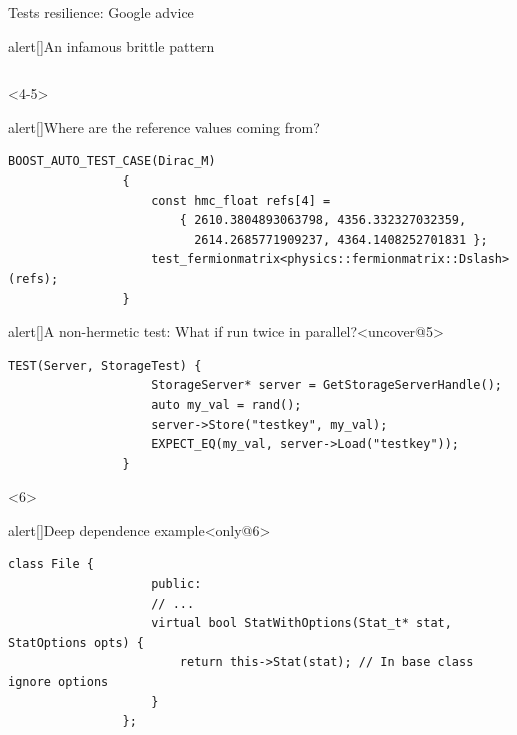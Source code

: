 \begin{frame}[fragile]{Tests resilience: Google advice}
\begin{onlyenv}
\begin{varblock}{alert}[\textwidth]{An infamous brittle pattern}
\begin{lstlisting}[style=MyCpp]
            \end{lstlisting}
        \end{varblock}
    \end{onlyenv}
    \begin{onlyenv}<4-5>
        \begin{varblock}{alert}[\textwidth]{Where are the reference values coming from?}
            \begin{lstlisting}[style=MyCpp]
                BOOST_AUTO_TEST_CASE(Dirac_M)
                {
                    const hmc_float refs[4] =
                        { 2610.3804893063798, 4356.332327032359,
                          2614.2685771909237, 4364.1408252701831 };
                    test_fermionmatrix<physics::fermionmatrix::Dslash>(refs);
                }
            \end{lstlisting}
        \end{varblock}
        \begin{varblock}{alert}[\textwidth]{A non-hermetic test: What if run twice in parallel?}<uncover@5>
            \begin{lstlisting}[style=MyCpp]
                TEST(Server, StorageTest) {
                    StorageServer* server = GetStorageServerHandle();
                    auto my_val = rand();
                    server->Store("testkey", my_val);
                    EXPECT_EQ(my_val, server->Load("testkey"));
                }
            \end{lstlisting}
        \end{varblock}
    \end{onlyenv}
    \begin{onlyenv}<6>
        \vspace{-3mm}
        \begin{varblock}{alert}[\textwidth]{Deep dependence example}<only@6>
            \begin{lstlisting}[style=MyCpp]
                class File {
                    public:
                    // ...
                    virtual bool StatWithOptions(Stat_t* stat, StatOptions opts) {
                        return this->Stat(stat); // In base class ignore options
                    }
                };

\end{lstlisting}
\end{varblock}
\end{onlyenv}
\end{frame}
